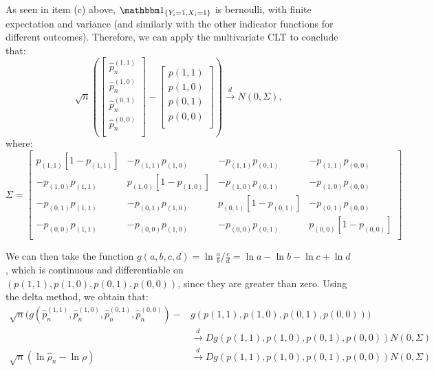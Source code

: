 \documentclass[12pt]{paper}
\begin{document}
As seen in item (c) above, $\indicate{Y_i=1,X_i=1}$ is bernoulli, with finite expectation and variance (and similarly with the other indicator functions for different outcomes). Therefore, we can apply the multivariate CLT to conclude that:
\begin{equation}
\sqrt{n}(\begin{bmatrix}
\hat{p}_{n}^{(1,1)}\\
\hat{p}_{n}^{(1,0)}\\
\hat{p}_{n}^{(0,1)}\\
\hat{p}_{n}^{(0,0)}\\
\end{bmatrix}
-\begin{bmatrix}
p(1,1)\\
p(1,0)\\
p(0,1)\\
p(0,0)\\
\end{bmatrix})
\overset{d}{\to} N(0, \Sigma),
\end{equation} 
\noindent where:
\begin{equation}
\Sigma=
\begin{bmatrix}
p_{(1,1)}[1-p_{(1,1)}] & -p_{(1,1)}p_{(1,0)} & -p_{(1,1)}p_{(0,1)} & -p_{(1,1)}p_{(0,0)} \\
-p_{(1,0)}p_{(1,1)} &  p_{(1,0)}[1-p_{(1,0)}] & -p_{(1,0)}p_{(0,1)} & -p_{(1,0)}p_{(0,0)} \\
-p_{(0,1)}p_{(1,1)} & -p_{(0,1)}p_{(1,0)} & p_{(0,1)}[1-p_{(0,1)}] & -p_{(0,1)}p_{(0,0)}\\
-p_{(0,0)}p_{(1,1)} & -p_{(0,0)}p_{(1,0)} & -p_{(0,0)}p_{(0,1)} & p_{(0,0)}[1-p_{(0,0)}] \\
\end{bmatrix}
\end{equation}

We can then take the function $g(a,b,c,d)=\ln{\frac{a}{b}\Big/\frac{c}{d}}=\ln{a}-\ln{b}-\ln{c}+\ln{d}$, which is continuous and differentiable on $(p(1,1),p(1,0),p(0,1),p(0,0))$, since they are greater than zero. Using the delta method, we obtain that:
\begin{equation}
\begin{split}
\sqrt{n}(g(\hat{p}_{n}^{(1,1)},\hat{p}_{n}^{(1,0)},\hat{p}_{n}^{(0,1)},\hat{p}_{n}^{(0,0)})-&g(p(1,1),p(1,0),p(0,1),p(0,0)))\\
&\overset{d}{\to} Dg(p(1,1),p(1,0),p(0,1),p(0,0)) N(0,\Sigma)\\
\sqrt{n}(\ln{\hat{\rho}_n}-\ln{\rho})&\overset{d}{\to}Dg(p(1,1),p(1,0),p(0,1),p(0,0)) N(0,\Sigma)
\end{split}
\end{equation}
\end{document}
